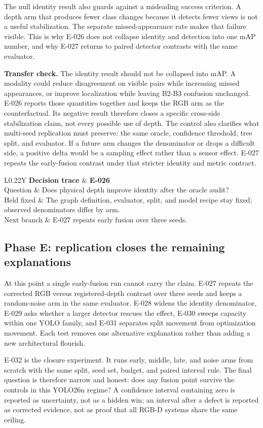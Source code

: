 \documentclass[preprint,12pt]{elsarticle}
\newcommand{\decisioncard}[4]{%
\begin{table}[H]\centering\small
\begin{tabularx}{\columnwidth}{L{0.22\columnwidth}Y}
\toprule
\textbf{Decision trace} & \textbf{#1}\\
Question & #2\\
Held fixed & #3\\
Next branch & #4\\
\bottomrule
\end{tabularx}
\end{table}}
\begin{document}
The null identity result also guards against a misleading success criterion. A
depth arm that produces fewer class changes because it detects fewer views is
not a useful stabilization. The separate missed-appearance rate makes that
failure visible. This is why E-026 does not collapse identity and detection
into one mAP number, and why E-027 returns to paired detector contrasts with
the same evaluator.

\textbf{Transfer check.} The identity result should not be collapsed into
mAP. A modality could reduce disagreement on visible pairs while increasing
missed appearances, or improve localization while leaving B2-B3 confusion
unchanged. E-026 reports those quantities together and keeps the RGB arm as
the counterfactual. Its negative result therefore closes a specific
cross-side stabilization claim, not every possible use of depth. The control
also clarifies what multi-seed replication must preserve: the same oracle,
confidence threshold, tree split, and evaluator. If a future arm changes the
denominator or drops a difficult side, a positive delta would be a sampling
effect rather than a sensor effect. E-027 repeats the early-fusion contrast
under that stricter identity and metric contract.

\decisioncard{E-026}{Does physical depth improve identity after the oracle audit?}{The graph definition, evaluator, split, and model recipe stay fixed; observed denominators differ by arm.}{E-027 repeats early fusion over three seeds.}
\subsection{Phase E: replication closes the remaining explanations}
At this point a single early-fusion run cannot carry the claim. E-027 repeats
the corrected RGB versus registered-depth contrast over three seeds and keeps a
random-noise arm in the same evaluator. E-028 widens the identity denominator,
E-029 asks whether a larger detector rescues the effect, E-030 sweeps capacity
within one YOLO family, and E-031 separates split movement from optimization
movement. Each test removes one alternative explanation rather than adding a
new architectural flourish.

E-032 is the closure experiment. It runs early, middle, late, and noise arms
from scratch with the same split, seed set, budget, and paired interval rule.
The final question is therefore narrow and honest: does any fusion point
survive the controls in this YOLO26n regime? A confidence interval containing
zero is reported as uncertainty, not as a hidden win; an interval after a
defect is reported as corrected evidence, not as proof that all RGB-D systems
share the same ceiling.
\end{document}
